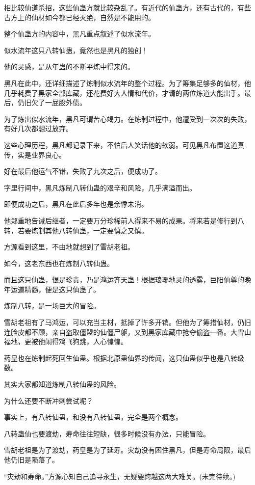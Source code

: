 \begin{this_body}
相比较仙道杀招，这些仙蛊方就比较杂乱了。有近代的仙蛊方，还有古代的，有些古方上的仙材如今都已经灭绝，自然是不能用的。

整个仙蛊方的内容中，黑凡重点叙述了似水流年。

似水流年这只八转仙蛊，竟然也是黑凡的独创！

他的灵感，是从年蛊的不断平炼中得来的。

黑凡在此中，还详细描述了炼制似水流年的整个过程。为了筹集足够多的仙材，他几乎耗费了黑家全部库藏，还花费好大人情和代价，才请的两位炼道大能出手。最后，仍旧欠了一屁股外债。

为了炼出似水流年，黑凡可谓苦心竭力。在炼制过程中，他遭受到一次次的失败，有好几次都想过放弃。

这些心理历程，黑凡都记录下来，不怕后人笑话他的软弱。可见黑凡布置这道真传，实是业界良心。

好在最后他运气不错，失败了九次之后，便成功了。

字里行间中，黑凡炼制八转仙蛊的艰辛和风险，几乎满溢而出。

即便成功之后，黑凡在此后多年也是余悸未消。

他郑重地告诫后继者，一定要万分珍稀前人得来不易的成果。将来若是修行到八转，若要炼制其他八转仙蛊，一定要慎之又慎。

方源看到这里，不由地就想到了雪胡老祖。

如今，这老东西也在炼制八转仙蛊。

而且这只仙蛊，很是珍贵，乃是鸿运齐天蛊！根据琅琊地灵的透露，巨阳仙尊的晚年运道精髓，便是这只仙蛊了。

炼制八转，是一场巨大的冒险。

雪胡老祖有了马鸿运，可以充当主材，抵掉了许多开销。但他为了筹措仙材，仍旧连脸皮都不顾，亲自盗取僵盟的仙僵尸躯，又到黑家库藏中抢夺偷盗一番。大雪山福地，更被他闹得鸡飞狗跳，人心惶惶。

药皇也在炼制起死回生仙蛊。根据北原蛊仙界的传闻，这只仙蛊似乎也是八转级数。

其实大家都知道炼制八转仙蛊的风险。

为什么还要不断冲刺尝试呢？

事实上，有八转仙蛊，和没有八转仙蛊，完全是两个概念。

八转蛊仙也要渡劫，寿命往往短缺，很多时候没有办法，只能冒险。

雪胡老祖是为了渡劫，药皇是为了延寿。灾劫没有困住黑凡，但是寿命局限，最后他仍旧是陨落了。

“灾劫和寿命。”方源心知自己追寻永生，无疑要跨越这两大难关。(未完待续。)

\end{this_body}

